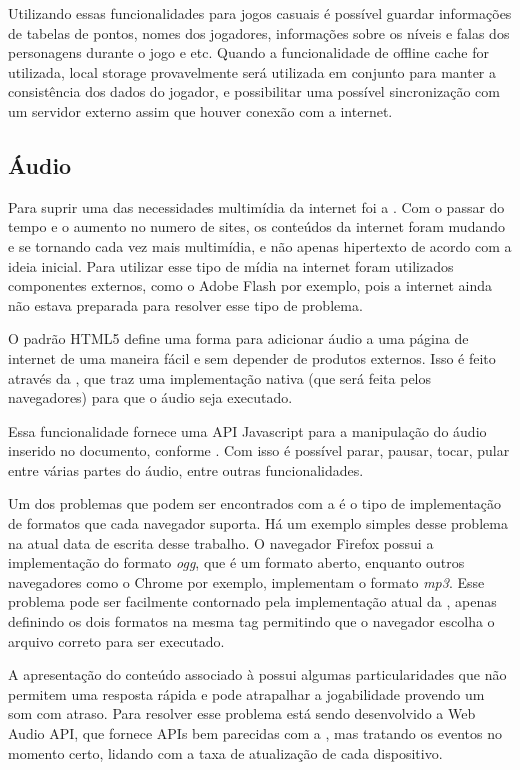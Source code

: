 Utilizando essas funcionalidades para jogos casuais é possível
guardar informações de tabelas de pontos, nomes dos jogadores,
informações sobre os níveis e falas dos personagens durante o jogo e
etc. Quando a funcionalidade de offline cache for utilizada, local
storage provavelmente será utilizada em conjunto para manter a
consistência dos dados do jogador, e possibilitar uma possível
sincronização com um servidor externo assim que houver conexão com a
internet.

\subsection{Áudio}
Para suprir uma das necessidades multimídia
da internet foi a \tagaudio. Com o passar do tempo e o aumento no
numero de sites, os conteúdos da internet foram mudando
e se tornando cada vez mais multimídia, e não apenas hipertexto de
acordo com a ideia inicial. Para utilizar esse tipo de mídia na
internet foram utilizados componentes externos, como o Adobe Flash por
exemplo, pois a internet ainda não estava preparada para resolver esse
tipo de problema.

O padrão HTML5 define uma forma para adicionar áudio a uma página de
internet de uma maneira fácil e sem depender de produtos externos.
Isso é feito através da \tagaudio, que traz uma
implementação nativa (que será feita pelos navegadores) para que o
áudio seja executado.

Essa funcionalidade fornece uma API Javascript para a manipulação do
áudio inserido no documento, conforme
.
Com isso é possível parar, pausar, tocar,
pular entre várias partes do áudio, entre outras funcionalidades.

Um dos problemas que podem ser encontrados com a \tagaudio  é o tipo de
implementação de formatos que cada navegador suporta. Há um exemplo
simples desse problema na atual data de escrita desse trabalho. O
navegador Firefox possui a implementação do formato \textit{ogg}, que
é um formato aberto, enquanto outros navegadores como o Chrome por
exemplo, implementam o formato \textit{mp3}. Esse problema pode ser
facilmente contornado pela implementação atual da \tagaudio,
apenas definindo os dois formatos na mesma tag permitindo que o
navegador escolha o arquivo correto para ser executado.

A apresentação do conteúdo associado à \tagaudio  possui algumas particularidades que não permitem uma
resposta rápida e pode atrapalhar a jogabilidade provendo um som com
atraso. Para resolver esse problema está sendo desenvolvido a
Web Audio API, que fornece APIs bem parecidas com a \tagaudio, mas
tratando os eventos no momento certo, lidando com a taxa de
atualização de cada dispositivo.

